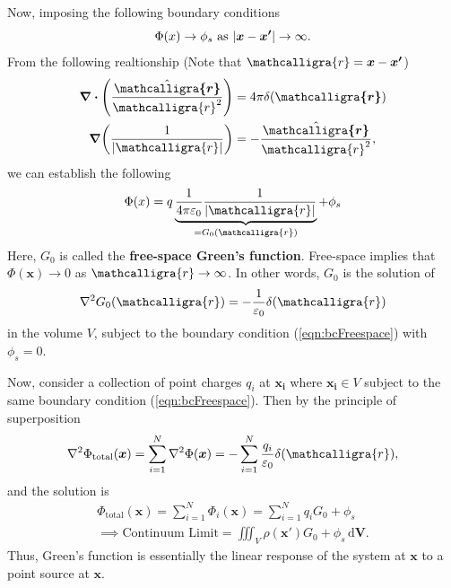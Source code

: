 \documentclass[12pt,english]{article}
\newcommand{\dmr}[1]{\, \mathrm{d}#1} %
\newcommand{\curly}[1]{\ensuremath{\mathcalligra{#1}}}
\let\oldhat\hat
\renewcommand{\vec}[1]{\boldsymbol{#1}}
\renewcommand{\hat}[1]{\oldhat{\boldsymbol{#1}}}
\begin{document}
Now, imposing the following boundary conditions
\begin{equation}
    \Phi(x) \to \phi_s \text{ as } \abs{\vec{x} - \vec{x'}} \to \infty. \label{eqn:bcFreespace}
\end{equation}
From the following realtionship (Note that $\curly{r} = \vec{x} - \vec{x'}$)
\begin{subequations}
    \begin{align}
        \div\left(\frac{\hat{\curly{r}}}{\curly{r}^2}\right) & = 4\pi\delta(\vec{\curly{r}})           \\
        \grad(\frac{1}{\abs{\curly{r}}})                     & = -\frac{\hat{\curly{r}}}{\curly{r}^2},
    \end{align}
\end{subequations}
we can establish the following
\begin{equation}
    \Phi(x) = q \underbrace{\frac{1}{4\pi\varepsilon_0}\frac{1}{\abs{\curly{r}}}}_{=G_0(\curly{r})} + \phi_s
\end{equation}
Here, $G_0$ is called the \textbf{free-space Green's function}. Free-space implies that $\Phi(\vec{x}) \to 0$ as $\curly{r} \to \infty$. In other words, $G_0$ is the solution of
\begin{equation}
    \laplacian G_0(\curly{r}) = -\frac{1}{\varepsilon_0} \delta(\curly{r}) \label{eqn:Gfn5}
\end{equation}
in the volume $V$, subject to the boundary condition (\ref{eqn:bcFreespace}) with $\phi_s = 0$.

Now, consider a collection of point charges $q_i$ at $\vec{x_i}$ where $\vec{x_i} \in V$ subject to the same boundary condition (\ref{eqn:bcFreespace}). Then by the principle of superposition
\begin{equation}
    \laplacian \Phi_{\text{total}}(\vec{x}) = \sum_{i = 1}^{N}\laplacian\Phi(\vec{x}) = - \sum_{i = 1}^{N} \frac{q_i}{\varepsilon_0} \delta(\curly{r}),
\end{equation}
and the solution is
\begin{subequations}\label{eqn:FreeGreenSol}
    \begin{align}
        \Phi_{\text{total}}(\vec{x}) = \sum_{i = 1}^{N} \Phi_i(\vec{x}) = \sum_{i = 1}^{N} q_i G_0 + \phi_s \\
        \implies \text{Continuum Limit} = \iiint_{V} \rho(\vec{x'}) G_0 + \phi_s \dmr{\vec{V}}.
    \end{align}
\end{subequations}
Thus, Green's function is essentially the linear response of the system at $\vec{x}$ to a point source at $\vec{x}$.
\end{document}
